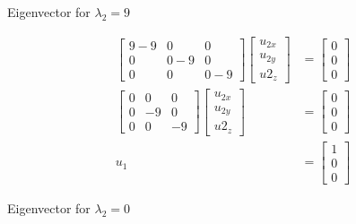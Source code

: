 \documentclass[11pt,letterpaper]{article}
\begin{document}
\begin{enumerate}
Eigenvector for \( \lambda_2 = 9 \)

\begin{align*}
    \begin{bmatrix}
        9-9 & 0 & 0 \\
        0 & 0-9 & 0 \\
        0 & 0 & 0-9
    \end{bmatrix}
    \begin{bmatrix}
        u_{2x} \\ u_{2y} \\ u2_z
    \end{bmatrix}
    &= \begin{bmatrix}
        0 \\ 0 \\ 0
    \end{bmatrix} \\
    \begin{bmatrix}
        0 & 0 & 0 \\
        0 & -9 & 0 \\
        0 & 0 & -9
    \end{bmatrix}
    \begin{bmatrix}
        u_{2x} \\ u_{2y} \\ u2_z
    \end{bmatrix}
    &= \begin{bmatrix}
        0 \\ 0 \\ 0
    \end{bmatrix} \\
    u_1
    &= \begin{bmatrix}
        1 \\ 0 \\ 0
    \end{bmatrix}
\end{align*}

Eigenvector for \( \lambda_2 = 0 \)


\end{enumerate}
\end{document}
